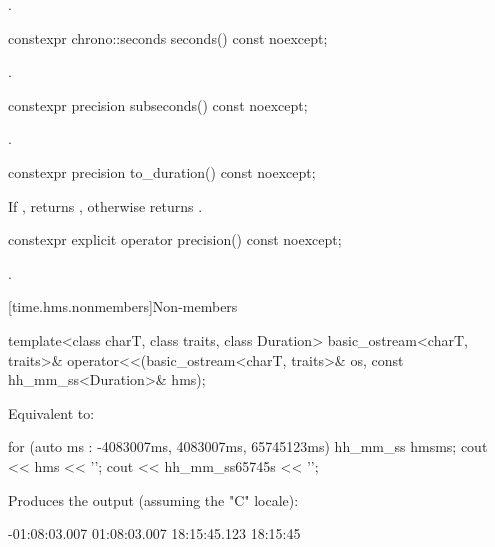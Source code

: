 \begin{itemdescr}
\pnum
\returns
{}.
\end{itemdescr}

%
\begin{itemdecl}
constexpr chrono::seconds seconds() const noexcept;
\end{itemdecl}

\begin{itemdescr}
\pnum
\returns
{}.
\end{itemdescr}

%
\begin{itemdecl}
constexpr precision subseconds() const noexcept;
\end{itemdecl}

\begin{itemdescr}
\pnum
\returns
{}.
\end{itemdescr}

%
\begin{itemdecl}
constexpr precision to_duration() const noexcept;
\end{itemdecl}

\begin{itemdescr}
\pnum
\returns
If , returns ,
otherwise returns .
\end{itemdescr}

%
\begin{itemdecl}
constexpr explicit operator precision() const noexcept;
\end{itemdecl}

\begin{itemdescr}
\pnum
\returns
{}.
\end{itemdescr}

[time.hms.nonmembers]{Non-members}

\begin{itemdecl}
template<class charT, class traits, class Duration>
basic_ostream<charT, traits>&
operator<<(basic_ostream<charT, traits>& os, const hh_mm_ss<Duration>& hms);
\end{itemdecl}

\begin{itemdescr}
\pnum
\effects
Equivalent to:

\pnum
\begin{example}
\begin{codeblock}
for (auto ms : {-4083007ms, 4083007ms, 65745123ms}) {
  hh_mm_ss hms{ms};
  cout << hms << '\n';
}
cout << hh_mm_ss{65745s} << '\n';
\end{codeblock}
Produces the output (assuming the "C" locale):
\begin{codeblock}
-01:08:03.007
01:08:03.007
18:15:45.123
18:15:45
\end{codeblock}
\end{example}
\end{itemdescr}

